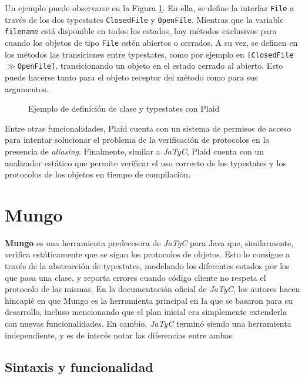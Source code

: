 Un ejemplo puede observarse en la Figura \ref{teorico:plaid}. En ella, se define la interfaz \texttt{File} a través de los dos typestates \texttt{ClosedFile} y \texttt{OpenFile}. Mientras que la variable \texttt{filename} está disponible en todos los estados, hay métodos exclusivos para cuando los objetos de tipo \texttt{File} estén abiertos o cerrados. A su vez, se definen en los métodos las transiciones entre typestates, como por ejemplo en \texttt{[ClosedFile$\gg$OpenFile]}, transicionando un objeto en el estado cerrado al abierto. Esto puede hacerse tanto para el objeto receptor del método como para sus argumentos.

\begin{figure}[htbp]
    \centering
    
    \caption{Ejemplo de definición de clase y typestates con Plaid}
    \label{teorico:plaid}
\end{figure}

Entre otras funcionalidades, Plaid cuenta con un sistema de permisos de acceso\cite{plaid:permissions} para intentar solucionar el problema de la verificación de protocolos en la presencia de \textit{aliasing}. Finalmente, similar a \textit{JaTyC}, Plaid cuenta con un analizador estático que permite verificar el uso correcto de los typestates y los protocolos de los objetos en tiempo de compilación.

\section{Mungo}

\textbf{Mungo}\cite{mungo:website}\cite{mungo:paper} es una herramienta predecesora de \textit{JaTyC} para Java que, similarmente, verifica estáticamente que se sigan los protocolos de objetos. Esto lo consigue a través de la abstracción de typestates, modelando los diferentes estados por los que pasa una clase, y reporta errores cuando código cliente no respeta el protocolo de las mismas. En la documentación oficial de \textit{JaTyC}\cite{jatyc:documentation}\cite{jatyc:msc-thesis}, los autores hacen hincapié en que Mungo es la herramienta principal en la que se basaron para su desarrollo, incluso mencionando que el plan inicial era simplemente extenderla con nuevas funcionalidades. En cambio, \textit{JaTyC} terminó siendo una herramienta independiente, y es de interés notar las diferencias entre ambas\cite{jatyc:mungo-comparison}.

\subsection{Sintaxis y funcionalidad}

